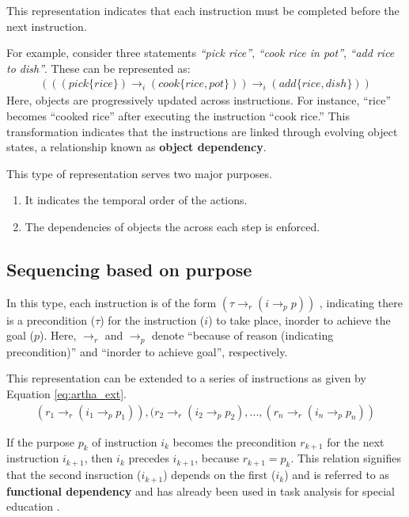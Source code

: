 \documentclass[a4paper,11pt]{lmcs}
\begin{document}
This representation indicates that each instruction must be completed before the next instruction.

For example, consider three statements \textit{``pick rice''}, \textit{``cook rice in pot''}, \textit{``add rice to dish''}. These can be represented as:
\begin{eqnarray}
 (((pick \{rice\}) \rightarrow_i (cook \{rice,
 pot\})) \rightarrow_i (add \{rice,dish\}))
\end{eqnarray}
Here, objects are progressively updated across instructions. For instance, “rice” becomes “cooked rice” after executing the instruction “cook rice.” This transformation indicates that the instructions are linked through evolving object states, a relationship known as \textbf{object dependency}.

This type of representation serves two major purposes.

\begin{enumerate}
 \item It indicates the temporal order of the actions.
 \item The dependencies of objects the across each step is enforced.
\end{enumerate}
\subsection{Sequencing based on purpose}
\label{sec:artha}
In this type, each instruction is of the form $(\tau \rightarrow_r (i \rightarrow_p p))$ \cite{llm_mira}, indicating there is a precondition ($\tau$) for the instruction ($i$) to take place, inorder to achieve the goal ($p$). Here, $\rightarrow_r$ and $\rightarrow_p$ denote ``because of reason (indicating precondition)'' and ``inorder to achieve  goal'', respectively.

This representation can be extended to a series of instructions as given by Equation \ref{eq:artha_ext}.
\begin{eqnarray}
 \label{eq:artha_ext}
 (r_1 \rightarrow_r (i_1 \rightarrow_p p_1)), (r_2 \rightarrow_r (i_2 \rightarrow_p p_2), ..., (r_n \rightarrow_r (i_n \rightarrow_p p_n))
\end{eqnarray}

If the purpose $p_k$ of instruction $i_k$ becomes the precondition $r_{k+1}$ for the next instruction $i_{k+1}$, then $i_k$ precedes $i_{k+1}$, because $r_{k+1} = p_k$. This relation signifies that the second insruction ($i_{k+1}$) depends on the first ($i_k$) and is referred to as \textbf{functional dependency} and has already been used in task analysis for special education \cite{ta}.
\end{document}
